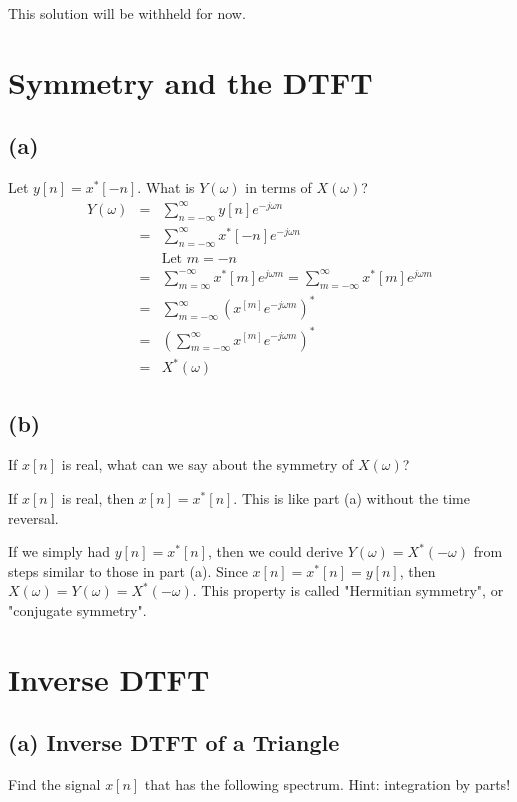 \documentclass[11pt]{article}
\begin{document}
{\color{blue}
This solution will be withheld for now.
}

\section{Symmetry and the DTFT}
\subsection*{(a)}

Let $y[n] = x^*[-n]$. What is $Y(\omega)$ in terms of $X(\omega)$?
{\color{blue}
\begin{eqnarray*}
Y(\omega) &=& \sum\limits_{n=-\infty}^\infty y[n]e^{-j\omega n} \\
&=& \sum\limits_{n=-\infty}^\infty x^*[-n]e^{-j\omega n} \\
&& \text{Let $m = -n$} \\
&=& \sum\limits_{m=\infty}^{-\infty} x^*[m]e^{j\omega m} = \sum\limits_{m=-\infty}^{\infty} x^*[m]e^{j\omega m} \\
&=& \sum\limits_{m=-\infty}^{\infty} \left( x^[m]e^{-j\omega m}\right)^* \\
&=& \left( \sum\limits_{m=-\infty}^{\infty}  x^[m]e^{-j\omega m}\right)^* \\
&=& X^*(\omega)
\end{eqnarray*}
}


\subsection*{(b)}

If $x[n]$ is real, what can we say about the symmetry of $X(\omega)$?

{\color{blue}
If $x[n]$ is real, then $x[n] = x^*[n]$. This is like part (a) without the time reversal. 

If we simply had $y[n] = x^*[n]$, then we could derive $Y(\omega) = X^*(-\omega)$ from steps similar to those in part (a). Since $x[n] = x^*[n] = y[n]$, then $X(\omega) = Y(\omega) = X^*(-\omega)$. This property is called "Hermitian symmetry", or "conjugate symmetry".
}

\section{Inverse DTFT}
\subsection*{(a) Inverse DTFT of a Triangle}
Find the signal $x[n]$ that has the following spectrum. Hint: integration by parts!
\end{document}
